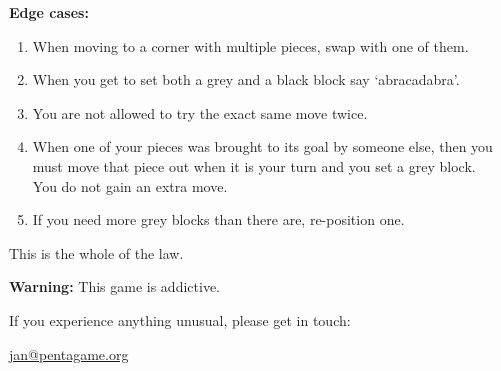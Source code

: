 \skipper

    \raggedright
    
    \vspace{5ex}
    
    \textbf{Edge cases:}

    \begin{enumerate}
        \item When moving to a corner with multiple pieces, swap with one of them.
        \item When you get to set both a grey and a black block say `abracadabra'.
        \item You are not allowed to try the exact same move twice.        
        \item When one of your pieces was brought to its goal by someone else, then you must move that piece out when it is your turn and you set a grey block.\\ You do not gain an extra move.
        \item If you need more grey blocks than there are, re-position one.
    \end{enumerate}

\hrulefill


\vspace{5ex}

\begin{centering}
    This is the whole of the law.
\end{centering}

\vfill

\begin{framed}
\centering

\textbf{Warning: }This game is addictive.

If you experience anything unusual, please get in touch:

\href{mailto:jan@pentagame.org}{jan@pentagame.org}

\end{framed}
